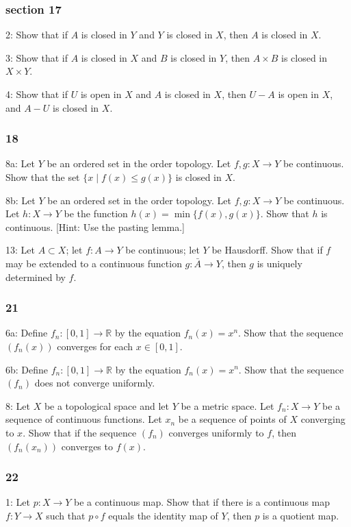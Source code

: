 \documentclass{article}
\begin{document}
\subsubsection*{section 17}
2: Show that if $A$ is closed in $Y$ and $Y$ is closed in $X$, then $A$ is closed in $X$.

3: Show that if $A$ is closed in $X$ and $B$ is closed in $Y$, then $A \times B$ is closed in $X \times Y$.

4: Show that if $U$ is open in $X$ and $A$ is closed in $X$, then $U-A$ is open in $X$, and $A-U$ is closed in $X$.

\subsubsection*{18}
8a: Let $Y$ be an ordered set in the order topology. Let $f, g: X \rightarrow Y$ be continuous. Show that the set $\{x \mid f(x) \leq g(x)\}$ is closed in $X$.

8b: Let $Y$ be an ordered set in the order topology. Let $f, g: X \rightarrow Y$ be continuous. Let $h: X \rightarrow Y$ be the function $h(x)=\min \{f(x), g(x)\}.$ Show that $h$ is continuous. [Hint: Use the pasting lemma.] 

13: Let $A \subset X$; let $f: A \rightarrow Y$ be continuous; let $Y$ be Hausdorff. Show that if $f$ may be extended to a continuous function $g: \bar{A} \rightarrow Y$, then $g$ is uniquely determined by $f$.

\subsubsection*{21}

6a: Define $f_{n}:[0,1] \rightarrow \mathbb{R}$ by the equation $f_{n}(x)=x^{n}$. Show that the sequence $\left(f_{n}(x)\right)$ converges for each $x \in[0,1]$. 

6b: Define $f_{n}:[0,1] \rightarrow \mathbb{R}$ by the equation $f_{n}(x)=x^{n}$. Show that the sequence $\left(f_{n}\right)$ does not converge uniformly.

8: Let $X$ be a topological space and let $Y$ be a metric space. Let $f_{n}: X \rightarrow Y$ be a sequence of continuous functions. Let $x_{n}$ be a sequence of points of $X$ converging to $x$. Show that if the sequence $\left(f_{n}\right)$ converges uniformly to $f$, then $\left(f_{n}\left(x_{n}\right)\right)$ converges to $f(x)$.

\subsubsection*{22}
1: Let $p: X \rightarrow Y$ be a continuous map. Show that if there is a continuous map $f: Y \rightarrow X$ such that $p \circ f$ equals the identity map of $Y$, then $p$ is a quotient map.
\end{document}
